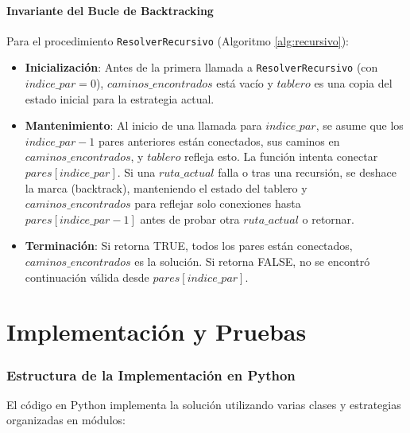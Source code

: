 \documentclass[spanish]{article}
\numberwithin{equation}{section}
\numberwithin{figure}{section}
\theoremstyle{definition}
\begin{document}
\subsection{Invariante del Bucle de Backtracking}
Para el procedimiento \texttt{ResolverRecursivo} (Algoritmo \ref{alg:recursivo}):
\begin{itemize}
    \item \textbf{Inicialización}: Antes de la primera llamada a \texttt{ResolverRecursivo} (con $indice\_par = 0$), $caminos\_encontrados$ está vacío y $tablero$ es una copia del estado inicial para la estrategia actual.
    \item \textbf{Mantenimiento}: Al inicio de una llamada para $indice\_par$, se asume que los $indice\_par-1$ pares anteriores están conectados, sus caminos en $caminos\_encontrados$, y $tablero$ refleja esto. La función intenta conectar $pares[indice\_par]$. Si una $ruta\_actual$ falla o tras una recursión, se deshace la marca (backtrack), manteniendo el estado del tablero y $caminos\_encontrados$ para reflejar solo conexiones hasta $pares[indice\_par-1]$ antes de probar otra $ruta\_actual$ o retornar.
    \item \textbf{Terminación}: Si retorna TRUE, todos los pares están conectados, $caminos\_encontrados$ es la solución. Si retorna FALSE, no se encontró continuación válida desde $pares[indice\_par]$.
\end{itemize}

\part{Implementación y Pruebas}

\section{Estructura de la Implementación en Python}
El código en Python implementa la solución utilizando varias clases y estrategias organizadas en módulos:
\end{document}

